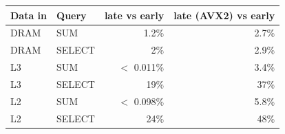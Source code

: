 \begin{tabular}{llrr}
\toprule
Data in & Query & late vs early & late (AVX2) vs early \\
\midrule
DRAM & SUM & 1.2\% & 2.7\% \\
DRAM & SELECT & 2\% & 2.9\% \\
L3 & SUM & $<$ 0.011\% & 3.4\% \\
L3 & SELECT & 19\% & 37\% \\
L2 & SUM & $<$ 0.098\% & 5.8\% \\
L2 & SELECT & 24\% & 48\% \\
\bottomrule
\end{tabular}
